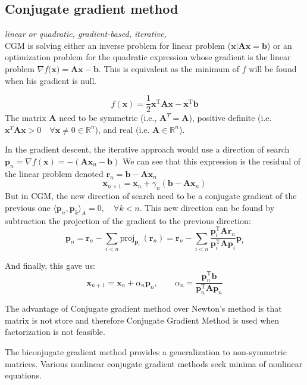 \documentclass[twocolumn]{article}
\numberwithin{equation}{section}
\begin{document}
	\subsection{Conjugate gradient method}
\emph{linear or quadratic, gradient-based, iterative, }\\
CGM is solving either an inverse problem for linear problem ($\mathbf{x|Ax=b}$) or an optimization problem for the quadratic expression whose gradient is the linear problem $\nabla f(\mathbf{x)=Ax-b}$. This is equivalent as the minimum of $f$ will be found when his gradient is null. 

$$ f(\mathbf{x}) = \frac12 \mathbf{x}^\mathrm{T} \mathbf{A}\mathbf{x} - \mathbf{x}^\mathrm{T} \mathbf{b} $$ 
The matrix $\mathbf{A}$ need to be symmetric (i.e., $\mathbf{A}^T = \mathbf{A}$), positive definite (i.e. $\mathbf{x}^T\mathbf{A}\mathbf{x} > 0 \quad \forall \mathbf{x}\not=0 \in \mathbb{R}^n$), and real (i.e. $\mathbf{A} \in \mathbb{R}^n$).


In the gradient descent, the iterative approach would use a direction of search $\mathbf{p}_n=\nabla f(\mathbf{x})=-(\mathbf{Ax}_n-\mathbf{b})$
We can see that this expression is the residual of the linear problem denoted $ \mathbf{r}_{n}=\mathbf{b}-\mathbf{Ax}_n$
$$\mathbf{x}_{n+1}=\mathbf{x}_n+\gamma_n(\mathbf{b}-\mathbf{Ax}_n)$$
But in CGM, the new direction of search need to be a conjugate gradient of the previous one $\langle \mathbf{p}_n,\mathbf{p}_k\rangle_{A}=0, \quad \forall k<n $. This new direction can be found by subtraction the projection of the gradient to the previous direction:
$$ \mathbf{p}_{n} = \mathbf{r}_{n} - \sum_{i < n} \mathrm{proj}_{\mathbf{p}_i}\,(\mathbf{r}_n) =\mathbf{r}_{n} - \sum_{i < n}\frac{\mathbf{p}_i^\mathrm{T} \mathbf{A} \mathbf{r}_{n}}{\mathbf{p}_i^\mathrm{T}\mathbf{A} \mathbf{p}_i} \mathbf{p}_i $$

And finally, this gave us:
 $$\mathbf{x}_{n+1} = \mathbf{x}_n + \alpha_n \mathbf{p}_n, \qquad 
 \alpha_{n} = \frac{\mathbf{p}_n^\mathrm{T} \mathbf{b}}{\mathbf{p}_n^\mathrm{T} \mathbf{A} \mathbf{p}_n}$$


The advantage of Conjugate gradient method over Newton's method is that matrix is not store and therefore Conjugate Gradient Method is used when factorization is not feasible.



The biconjugate gradient method provides a generalization to non-symmetric matrices. 
Various nonlinear conjugate gradient methods seek minima of nonlinear equations.
\end{document}
